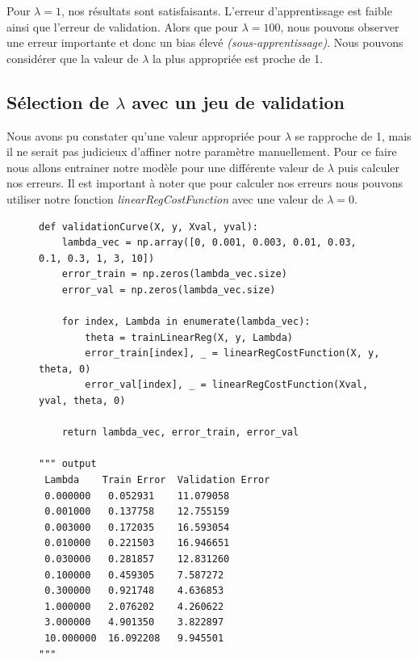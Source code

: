 Pour $\lambda = 1$, nos résultats sont satisfaisants. L'erreur d'apprentissage est faible ainsi que l'erreur de validation. Alors que pour $\lambda = 100$, nous pouvons observer une erreur importante et donc un bias élevé \textit{(sous-apprentissage)}.
Nous pouvons considérer que la valeur de $\lambda$ la plus appropriée est proche de 1.

\subsection{Sélection de $\lambda$ avec un jeu de validation}


Nous avons pu constater qu'une valeur appropriée pour $\lambda$ se rapproche de 1, mais il ne serait pas judicieux d'affiner notre paramètre manuellement. Pour ce faire nous allons entrainer notre modèle pour une différente valeur de $\lambda$ puis calculer nos erreurs. Il est 
important à noter que pour calculer nos erreurs nous pouvons utiliser notre fonction \textit{linearRegCostFunction} avec une valeur de $\lambda = 0$.

\vspace{.2cm}

\begin{figure}[!h]
\begin{verbatim}
def validationCurve(X, y, Xval, yval):
    lambda_vec = np.array([0, 0.001, 0.003, 0.01, 0.03, 0.1, 0.3, 1, 3, 10])
    error_train = np.zeros(lambda_vec.size)
    error_val = np.zeros(lambda_vec.size)

    for index, Lambda in enumerate(lambda_vec):
        theta = trainLinearReg(X, y, Lambda)
        error_train[index], _ = linearRegCostFunction(X, y, theta, 0)
        error_val[index], _ = linearRegCostFunction(Xval, yval, theta, 0)

    return lambda_vec, error_train, error_val

""" output
 Lambda    Train Error  Validation Error
 0.000000   0.052931    11.079058
 0.001000   0.137758    12.755159
 0.003000   0.172035    16.593054
 0.010000   0.221503    16.946651
 0.030000   0.281857    12.831260
 0.100000   0.459305    7.587272
 0.300000   0.921748    4.636853
 1.000000   2.076202    4.260622
 3.000000   4.901350    3.822897
 10.000000  16.092208   9.945501
"""
\end{verbatim}   
\end{figure}

